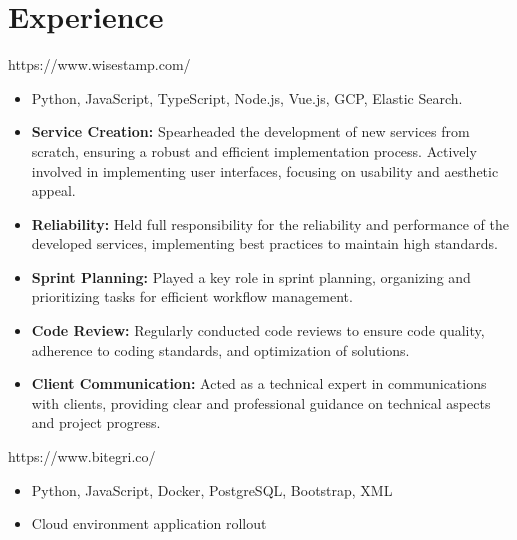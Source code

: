 \documentclass{resume}
\begin{document}



\section{Experience}


https://www.wisestamp.com/
\begin{itemize}
  \item Python, JavaScript, TypeScript, Node.js, Vue.js, GCP, Elastic Search.
  \item \textbf{Service Creation:} Spearheaded the development of new services from scratch, ensuring a robust and efficient implementation process. Actively involved in implementing user interfaces, focusing on usability and aesthetic appeal.
  \item \textbf{Reliability:} Held full responsibility for the reliability and performance of the developed services, implementing best practices to maintain high standards.
  \item \textbf{Sprint Planning:} Played a key role in sprint planning, organizing and prioritizing tasks for efficient workflow management.
  \item \textbf{Code Review:} Regularly conducted code reviews to ensure code quality, adherence to coding standards, and optimization of solutions.
  \item \textbf{Client Communication: } Acted as a technical expert in communications with clients, providing clear and professional guidance on technical aspects and project progress.
\end{itemize}


https://www.bitegri.co/
\begin{itemize}
  \item Python, JavaScript, Docker, PostgreSQL, Bootstrap, XML
  \item Cloud environment application rollout
  
\end{itemize}

\end{document}
